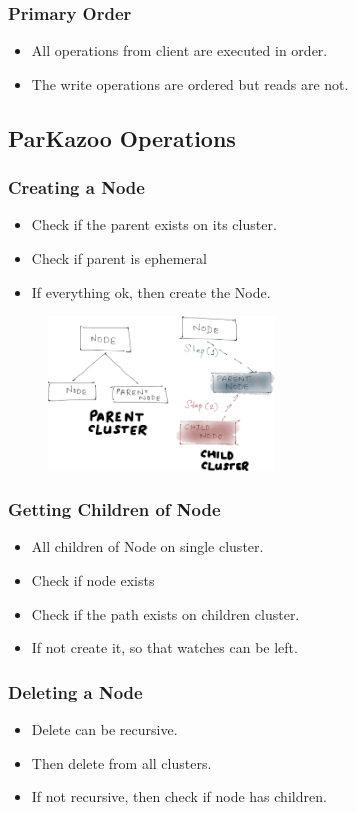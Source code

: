 \documentclass[10pt, compress]{beamer}
\begin{document}
\begin{frame}[fragile]
    \frametitle{Primary Order}
    \begin{itemize}
        \item All operations from client are executed in order.
        \item The write operations are ordered but reads are not.
    \end{itemize}
\end{frame}

\subsection{ParKazoo Operations}
\begin{frame}[fragile]
    \frametitle{Creating a Node}
    \begin{itemize}
        \item Check if the parent exists on its cluster.
        \item Check if parent is ephemeral
        \item If everything ok, then create the Node.
    \end{itemize}
    \begin{figure}[ht!]
        \centering
        \includegraphics[width=60mm]{images/ParKazooCreate.png}
    \end{figure}
\end{frame}

\begin{frame}[fragile]
    \frametitle{Getting Children of Node}
    \begin{itemize}
        \item All children of Node on single cluster.
        \item Check if node exists
        \item Check if the path exists on children cluster.
        \item If not create it, so that watches can be left.
    \end{itemize}
\end{frame}

\begin{frame}[fragile]
    \frametitle{Deleting a Node}
    \begin{itemize}
        \item Delete can be recursive.
        \item Then delete from all clusters.
        \item If not recursive, then check if node has children.
    \end{itemize}
\end{frame}
\end{document}
